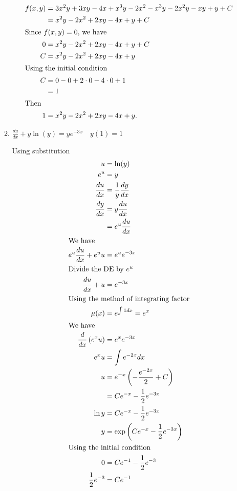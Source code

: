 \documentclass{zc-ust-hw}
\begin{document}
\begin{enumerate}
\begin{enumerate}
\begin{sol}
\begin{align}
            f(x,y)&=3x^2y+3xy-4x+x^3y-2x^2-x^3y-2x^2y-xy+y+C\\
                  &=x^2y-2x^2+2xy-4x+y+C\\
          \intertext{Since $f(x,y)=0$, we have}
            0&=x^2y-2x^2+2xy-4x+y+C\\
            C&=x^2y-2x^2+2xy-4x+y\\
          \intertext{Using the initial condition}
            C&=0-0+2\cdot0-4\cdot0+1\\
             &=1\\
             \intertext{Then}
            1&=x^2y-2x^2+2xy-4x+y
           .\end{align}
        \end{sol}
      \newpage
      \item $\frac{d y}{d x}+y \ln (y)=y e^{-3 x} \quad y(1)=1$
        \begin{sol} Using substitution
          \begin{align}
            u&=\ln(y)\\
            e^{u}&=y\\
            \frac{du}{dx}&=\frac{1}{y}\frac{dy}{dx}\\
            \frac{dy}{dx}&=y\frac{du}{dx}\\
                         &=e^{u}\frac{du}{dx}\\
            \intertext{We have}
            e^{u}\frac{du}{dx}+e^{u}u&=e^{u}e^{-3x}\\
            \intertext{Divide the DE by $e^{u}$}
            \frac{du}{dx}+u&=e^{-3x}\\
            \intertext{Using the method of integrating factor}
            \mu(x)&=e^{\int 1 dx}=e^x\\
            \intertext{We have}
            \frac{d}{dx}\left(e^x u\right)&=e^x e^{-3x}\\
            e^x u&=\int e^{-2x} dx\\
            u&=e^{-x}\left( -\frac{e^{-2x}}{2}+C  \right) \\
             &= Ce^{-x}-\frac{1}{2}e^{-3x}\\
            \ln y&=Ce^{-x}-\frac{1}{2}e^{-3x}\\
            y&=\exp \left( Ce^{-x}-\frac{1}{2}e^{-3x} \right)\\
            \intertext{Using the initial condition}
            0&=Ce^{-1}-\frac{1}{2}e^{-3}\\
            \frac{1}{2}e^{-3}&=Ce^{-1}\\

\end{align}
\end{sol}
\end{enumerate}
\end{enumerate}
\end{document}
